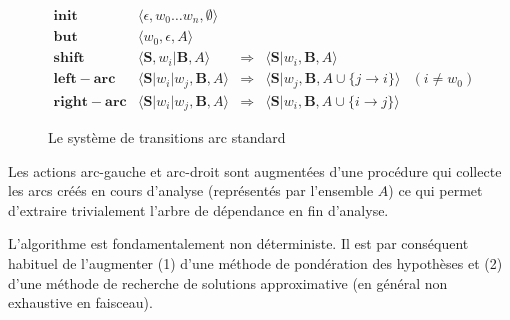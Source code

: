 \documentclass[11pt,openany]{book}
\begin{document}
\begin{figure}[htbp]
\begin{displaymath}
\begin{array}{rccll}
\mathbf{init}  &\langle \epsilon , w_0 \ldots w_n ,\emptyset \rangle\\
\mathbf{but}  & \langle w_0 ,\epsilon , A \rangle\\
\mathbf{shift} & \langle \mathbf{S} ,  w_i | \mathbf{B} , A   \rangle
&\Rightarrow &\langle \mathbf{S} | w_i ,  \mathbf{B} , A   \rangle\\
\mathbf{left-arc} &\langle \mathbf{S}|w_i | w_j , \mathbf{B} , A
\rangle &\Rightarrow& \langle \mathbf{S}| w_j , \mathbf{B} , A \cup \{
j\rightarrow i \}   \rangle & (i\not = w_0)\\
\mathbf{right-arc }  &\langle \mathbf{S}|w_i | w_j , \mathbf{B} , A   \rangle
&\Rightarrow & 
\langle \mathbf{S}| w_i , \mathbf{B} , A \cup \{
i \rightarrow j \}   \rangle
\end{array}
\end{displaymath}
\caption{\label{fig-AS}Le système de transitions arc standard}
\end{figure}


Les actions arc-gauche et arc-droit sont augmentées d'une procédure
qui collecte les arcs créés en cours d'analyse (représentés par
l'ensemble $A$) ce qui permet d'extraire trivialement l'arbre de
dépendance en fin d'analyse.

L'algorithme est fondamentalement non déterministe. Il est par
conséquent habituel de l'augmenter (1) d'une méthode de pondération des
hypothèses et (2) d'une méthode de recherche de solutions
approximative (en général non exhaustive en faisceau).
\end{document}
